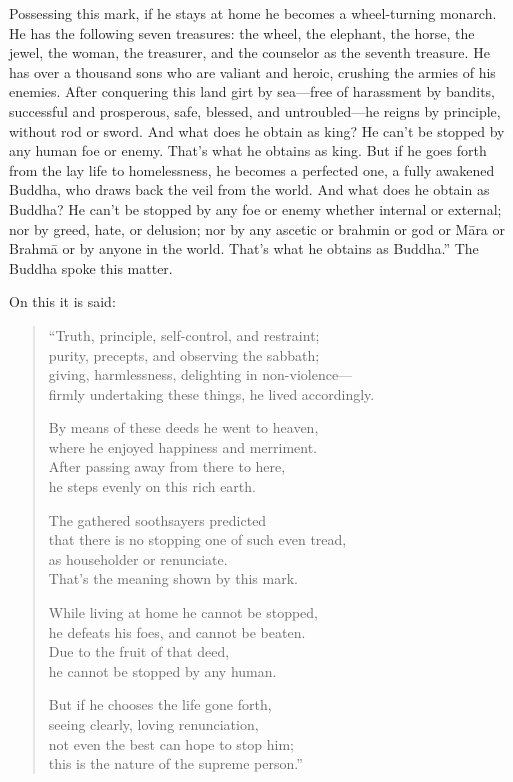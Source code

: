 \documentclass[12pt,openany]{book}%
\begin{document}
Possessing this mark, if he stays at home he becomes a wheel-turning monarch. He has the following seven treasures: the wheel, the elephant, the horse, the jewel, the woman, the treasurer, and the counselor as the seventh treasure. He has over a thousand sons who are valiant and heroic, crushing the armies of his enemies. After conquering this land girt by sea—free of harassment by bandits, successful and prosperous, safe, blessed, and untroubled—he reigns by principle, without rod or sword. And what does he obtain as king? He can’t be stopped by any human foe or enemy. That’s what he obtains as king. But if he goes forth from the lay life to homelessness, he becomes a perfected one, a fully awakened Buddha, who draws back the veil from the world. And what does he obtain as Buddha? He can’t be stopped by any foe or enemy whether internal or external; nor by greed, hate, or delusion; nor by any ascetic or brahmin or god or \textsanskrit{Māra} or \textsanskrit{Brahmā} or by anyone in the world. That’s what he obtains as Buddha.” The Buddha spoke this matter. 

On this it is said: 

\begin{verse}%
“Truth, principle, self-control, and restraint; \\
purity, precepts, and observing the sabbath; \\
giving, harmlessness, delighting in non-violence—\\
firmly undertaking these things, he lived accordingly. 

By means of these deeds he went to heaven, \\
where he enjoyed happiness and merriment. \\
After passing away from there to here, \\
he steps evenly on this rich earth. 

The gathered soothsayers predicted \\
that there is no stopping one of such even tread, \\
as householder or renunciate. \\
That’s the meaning shown by this mark. 

While living at home he cannot be stopped, \\
he defeats his foes, and cannot be beaten. \\
Due to the fruit of that deed, \\
he cannot be stopped by any human. 

But if he chooses the life gone forth, \\
seeing clearly, loving renunciation, \\
not even the best can hope to stop him; \\
this is the nature of the supreme person.” 

%
\end{verse}
\end{document}
